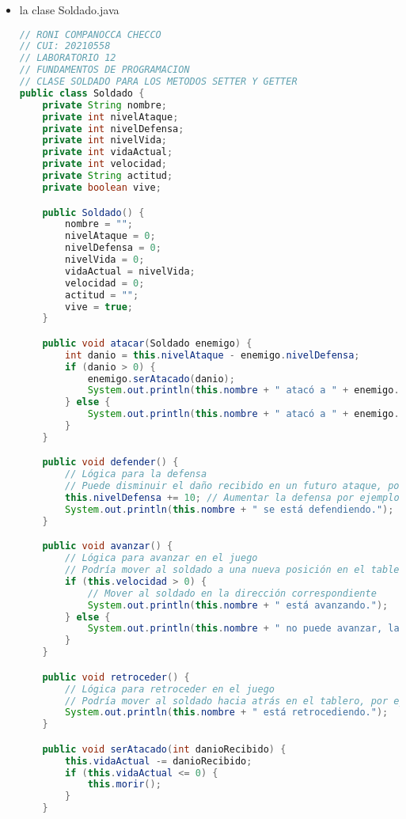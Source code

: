 \documentclass{article}
\begin{document}
\begin{itemize}
\begin{itemize}
\begin{lstlisting}[language=java]
}

        \end{lstlisting}

        \item la clase Soldado.java
        \begin{lstlisting}[language=java]
// RONI COMPANOCCA CHECCO
// CUI: 20210558
// LABORATORIO 12
// FUNDAMENTOS DE PROGRAMACION 
// CLASE SOLDADO PARA LOS METODOS SETTER Y GETTER
public class Soldado {
    private String nombre;
    private int nivelAtaque;
    private int nivelDefensa;
    private int nivelVida;
    private int vidaActual;
    private int velocidad;
    private String actitud;
    private boolean vive;

    public Soldado() {
        nombre = "";
        nivelAtaque = 0;
        nivelDefensa = 0;
        nivelVida = 0;
        vidaActual = nivelVida;
        velocidad = 0;
        actitud = "";
        vive = true;
    }

    public void atacar(Soldado enemigo) {
        int danio = this.nivelAtaque - enemigo.nivelDefensa;
        if (danio > 0) {
            enemigo.serAtacado(danio);
            System.out.println(this.nombre + " atacó a " + enemigo.nombre + " y le causó " + danio + " de daño.");
        } else {
            System.out.println(this.nombre + " atacó a " + enemigo.nombre + " pero no le causó daño.");
        }
    }

    public void defender() {
        // Lógica para la defensa
        // Puede disminuir el daño recibido en un futuro ataque, por ejemplo
        this.nivelDefensa += 10; // Aumentar la defensa por ejemplo
        System.out.println(this.nombre + " se está defendiendo.");
    }

    public void avanzar() {
        // Lógica para avanzar en el juego
        // Podría mover al soldado a una nueva posición en el tablero, por ejemplo
        if (this.velocidad > 0) {
            // Mover al soldado en la dirección correspondiente
            System.out.println(this.nombre + " está avanzando.");
        } else {
            System.out.println(this.nombre + " no puede avanzar, la velocidad es 0.");
        }
    }

    public void retroceder() {
        // Lógica para retroceder en el juego
        // Podría mover al soldado hacia atrás en el tablero, por ejemplo
        System.out.println(this.nombre + " está retrocediendo.");
    }

    public void serAtacado(int danioRecibido) {
        this.vidaActual -= danioRecibido;
        if (this.vidaActual <= 0) {
            this.morir();
        }
    }


\end{lstlisting}
\end{itemize}
\end{itemize}
\end{document}
